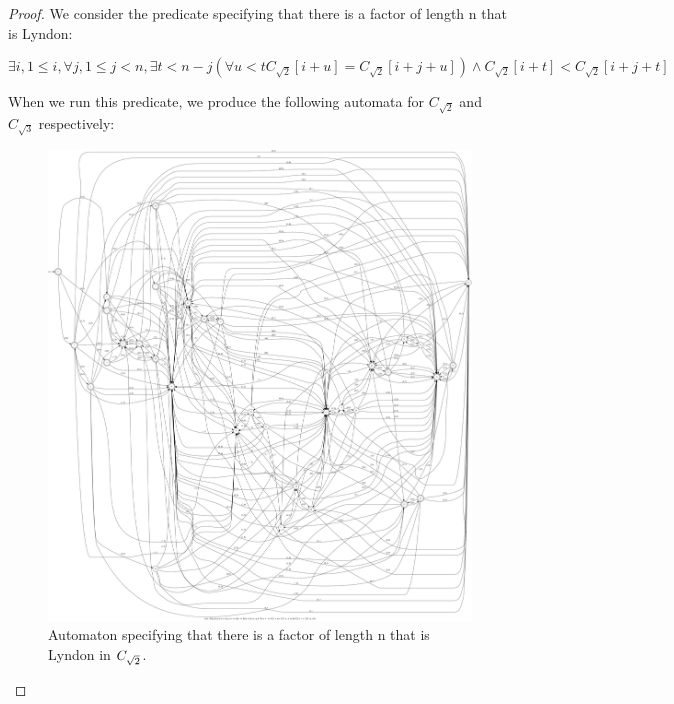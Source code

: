 \begin{proof}
We consider the predicate specifying that there is a factor of length n that is Lyndon:

\begin{equation*}
    \exists i, 1 \leq i, \forall j, 1 \leq j < n, \exists t < n-j  (\forall u < t C_{\sqrt{2}}[i + u] = C_{\sqrt{2}}[i + j + u]) \wedge C_{\sqrt{2}}[i + t] < C_{\sqrt{2}}[i + j + t]
\end{equation*}

When we run this predicate, we produce the following automata for $C_{\sqrt{2}}$ and $C_{\sqrt{3}}$ respectively:

\begin{figure}[h!]
\vspace{10mm}
	\begin{minipage}{0.45\textwidth}
      \centering
      \includegraphics[width=\linewidth]{sturmian_word_paper/paper_images/root2theorem25.jpg}
      \caption{Automaton specifying that there is a factor of length n that is Lyndon in $C_{\sqrt{2}}$.}
      \centering


\end{minipage}
\end{figure}
\end{proof}
